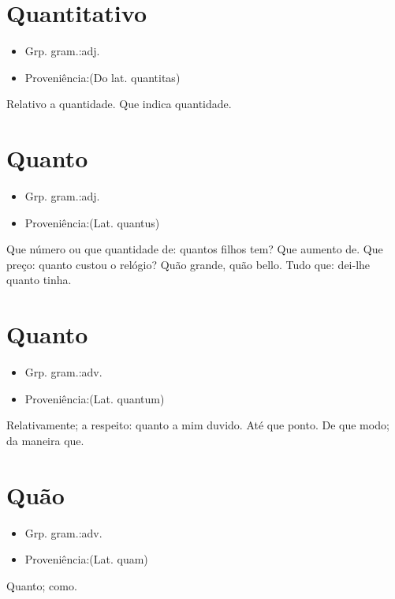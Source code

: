 \section{Quantitativo}
\begin{itemize}
\item {Grp. gram.:adj.}
\end{itemize}
\begin{itemize}
\item {Proveniência:(Do lat. \textunderscore quantitas\textunderscore )}
\end{itemize}
Relativo a quantidade.
Que indica quantidade.
\section{Quanto}
\begin{itemize}
\item {Grp. gram.:adj.}
\end{itemize}
\begin{itemize}
\item {Proveniência:(Lat. \textunderscore quantus\textunderscore )}
\end{itemize}
Que número ou que quantidade de: \textunderscore quantos filhos tem\textunderscore ?
Que aumento de.
Que preço: \textunderscore quanto custou o relógio\textunderscore ?
Quão grande, quão bello.
Tudo que: \textunderscore dei-lhe quanto tinha\textunderscore .
\section{Quanto}
\begin{itemize}
\item {Grp. gram.:adv.}
\end{itemize}
\begin{itemize}
\item {Proveniência:(Lat. \textunderscore quantum\textunderscore )}
\end{itemize}
Relativamente; a respeito: \textunderscore quanto a mim duvido\textunderscore .
Até que ponto.
De que modo; da maneira que.
\section{Quão}
\begin{itemize}
\item {Grp. gram.:adv.}
\end{itemize}
\begin{itemize}
\item {Proveniência:(Lat. \textunderscore quam\textunderscore )}
\end{itemize}
Quanto; como.

